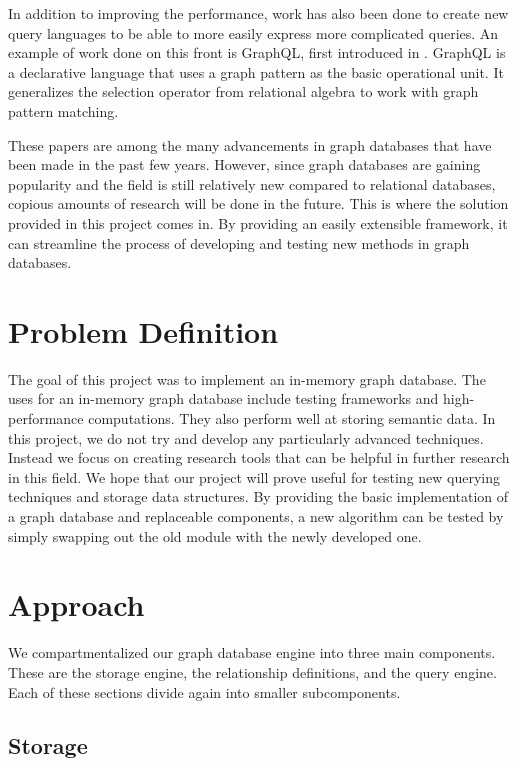 \documentclass[11pt]{article}
\begin{document}
	In addition to improving the performance, work has also been done to create new query languages to be able to more easily express more complicated queries.  An example of work done on this front is GraphQL, first introduced in \cite{He}.  GraphQL is a declarative language that uses a graph pattern as the basic operational unit.  It generalizes the selection operator from relational algebra to work with graph pattern matching.

These papers are among the many advancements in graph databases that have been made in the past few years.  However, since graph databases are gaining popularity and the field is still relatively new compared to relational databases, copious amounts of research will be done in the future.  This is where the solution provided in this project comes in.  By providing an easily extensible framework, it can streamline the process of developing and testing new methods in graph databases.

\section{Problem Definition}

The goal of this project was to implement an in-memory graph database. The uses for an in-memory graph database include testing frameworks and high-performance computations. They also perform well at storing semantic data. In this project, we do not try and develop any particularly advanced techniques. Instead we focus on creating research tools that can be helpful in further research in this field. We hope that our project will prove useful for testing new querying techniques and storage data structures.  By providing the basic implementation of a graph database and replaceable components, a new algorithm can be tested by simply swapping out the old module with the newly developed one.

\section{Approach}

We compartmentalized our graph database engine into three main components. These are the storage engine, the relationship definitions, and the query engine. Each of these sections divide again into smaller subcomponents.

\subsection{Storage}
\end{document}
